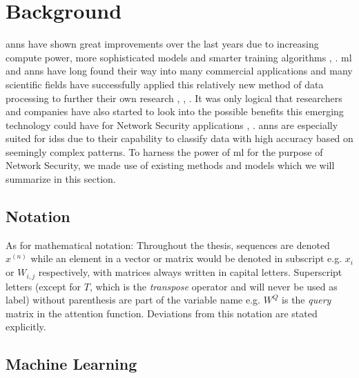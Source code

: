 \chapter{Background} \label{sec:background}

\glspl{ann} have shown great improvements over the last years due to increasing compute power, more sophisticated models and smarter training algorithms \cite{reboot_acgan}, \cite{unsupervised_learning_video_segmentation}. \gls{ml} and \glspl{ann} have long found their way into many commercial applications and many scientific fields have successfully applied this relatively new method of data processing to further their own research \cite{alpha_fold}, \cite{ai_medicine}, \cite{ai_antibiotic}. It was only logical that researchers and companies have also started to look into the possible benefits this emerging technology could have for Network Security applications \cite{kitsune}, \cite{ml_ids_survey}. \glspl{ann} are especially suited for \glspl{ids} due to their capability to classify data with high accuracy based on seemingly complex patterns. To harness the power of \gls{ml} for the purpose of Network Security, we made use of existing methods and models which we will summarize in this section.

\section{Notation} \label{sec:background:terminology:notation}

As for mathematical notation: Throughout the thesis, sequences are denoted $x^{(n)}$ while an element in a vector or matrix would be denoted in subscript e.g. $x_i$ or $W_{i,j}$ respectively, with matrices always written in capital letters. Superscript letters (except for $T$, which is the \textit{transpose} operator and will never be used as label) without parenthesis are part of the variable name e.g. $W^Q$ is the \textit{query} matrix in the attention function. Deviations from this notation are stated explicitly.

\section{Machine Learning} \label{sec:background:ml}

